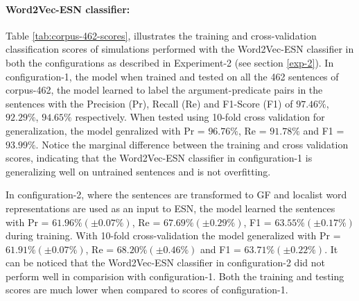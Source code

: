 \paragraph{Word2Vec-ESN classifier:} 

Table \ref{tab:corpus-462-scores}, illustrates the training and cross-validation classification scores of simulations performed with the Word2Vec-ESN classifier in both the configurations as described in Experiment-2 (see section \ref{exp-2}). In configuration-1, the model when trained and tested on all the 462 sentences of corpus-462, the model learned to label the argument-predicate pairs in the sentences with the Precision (Pr), Recall (Re) and F1-Score (F1) of $97.46 \%$, $92.29 \%$, $94.65 \%$ respectively. When tested using 10-fold cross validation for generalization, the model genralized with Pr = $96.76 \% $, Re = $91.78 \%$ and F1 = $93.99 \%$. Notice the marginal difference between the training and cross validation scores, indicating that the Word2Vec-ESN classifier in configuration-1 is generalizing well on untrained sentences and is not overfitting.

In configuration-2, where the sentences are transformed to GF and localist word representations are used as an input to ESN, the model learned the sentences with Pr = $61.96 \% (\pm 0.07\%)$, Re = $67.69 \% (\pm 0.29\%)$, F1 = $63.55 \% (\pm 0.17\%)$ during training. With 10-fold cross-validation the model generalized with Pr = $61.91 \% (\pm 0.07\%)$, Re = $68.20 \% (\pm 0.46\%)$ and F1 = $63.71 \% (\pm 0.22\%)$. It can be noticed that the Word2Vec-ESN classifier in configuration-2 did not perform well in comparision with configuration-1. Both the training and testing scores are much lower when compared to scores of configuration-1.


